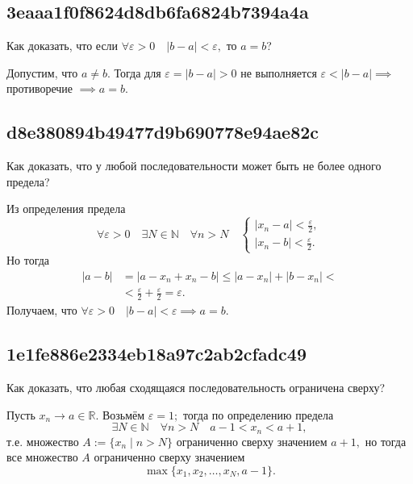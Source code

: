 \documentclass[11pt, a5paper]{article}
\newenvironment{note}[1]{\goodbreak\par\subsection{\hfill \color{lightgray}\tiny #1}}{}
\newenvironment{cloze}[2][\ldots]{\begin{leftbar}}{\end{leftbar}}
\begin{document}
    \begin{note}{3eaaa1f0f8624d8db6fa6824b7394a4a}
        Как доказать, что если \( \forall \varepsilon > 0 \quad |b - a| <
        \varepsilon, \) то \( a = b \)?

        \begin{cloze}{1}
            Допустим, что \( a \neq b. \) Тогда для \( \varepsilon = |b - a| > 0
            \) не выполняется \( \varepsilon < |b - a| \implies \) противоречие
            \( \implies a = b. \)
        \end{cloze}
    \end{note}

    \begin{note}{d8e380894b49477d9b690778e94ae82c}
        Как доказать, что у любой последовательности может быть не более одного
        предела?

        \begin{cloze}{1}
            Из определения предела \[
                \forall \varepsilon > 0 \quad \exists N \in \mathbb N \quad \forall n > N \quad
                \begin{cases}
                    |x_n - a| < \frac{\varepsilon}{2}, \\
                    |x_n - b| < \frac{\varepsilon}{2}.
                \end{cases}
            \]
            Но тогда \[
                \begin{aligned}
                    |a - b| &= |a - x_n + x_n - b| \leqslant |a - x_n| + |b - x_n| < \\
                            &< \frac{\varepsilon}{2} +
                            \frac{\varepsilon}{2} = \varepsilon.
                \end{aligned}
            \]
            Получаем, что \(
                \forall \varepsilon > 0 \quad |b - a| <
                \varepsilon \implies a = b.
            \)
        \end{cloze}
    \end{note}

    \begin{note}{1e1fe886e2334eb18a97c2ab2cfadc49}
        Как доказать, что любая сходящаяся последовательность ограничена сверху?

        \begin{cloze}{1}
            Пусть \( x_n \to a \in \mathbb R. \) Возьмём \( \varepsilon = 1; \)
            тогда по определению предела \[
                \exists N \in \mathbb N \quad \forall n > N \quad a -
                1 < x_n < a + 1,
            \] т.е. множество \( A := \{ x_n \mid n > N \} \) ограниченно сверху
            значением \( a + 1, \) но тогда все множество \( A \) ограниченно
            сверху значением \[
                \max \{ x_1, x_2, \ldots, x_N, a - 1 \}.
            \]
        \end{cloze}
    \end{note}
\end{document}
